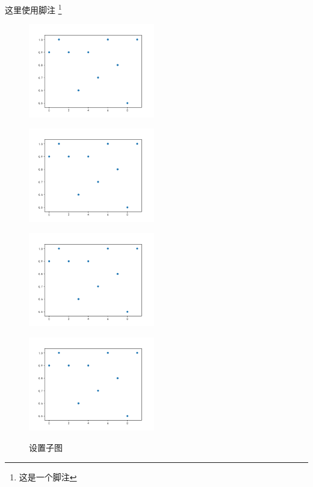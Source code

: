 \documentclass{cumcmthesis}
\begin{document}
	这里使用脚注 \footnote{这是一个脚注}
	

	
\begin{figure}[htbp]
	\centering
		\begin{minipage}[t]{0.4\linewidth}
			\centering
			\includegraphics[width=5.5cm]{Acc1.png}
			\label{fig:sample-figure-a}
		\end{minipage}
		\begin{minipage}[t]{0.4\linewidth}
			\centering
			\includegraphics[width=5.5cm]{Acc1.png}
			\label{fig:sample-figure-b}
		\end{minipage}
	\quad
		\begin{minipage}[t]{0.4\linewidth}
			\centering
			\includegraphics[width=5.5cm]{Acc1.png}
			\label{fig:sample-figure-c}
		\end{minipage}
		\begin{minipage}[t]{0.4\linewidth}
			\centering
			\includegraphics[width=5.5cm]{Acc1.png}
			\label{fig:sample-figure-d}
		\end{minipage}
	
	\centering
	\caption{设置子图}
\end{figure}
\end{document}

